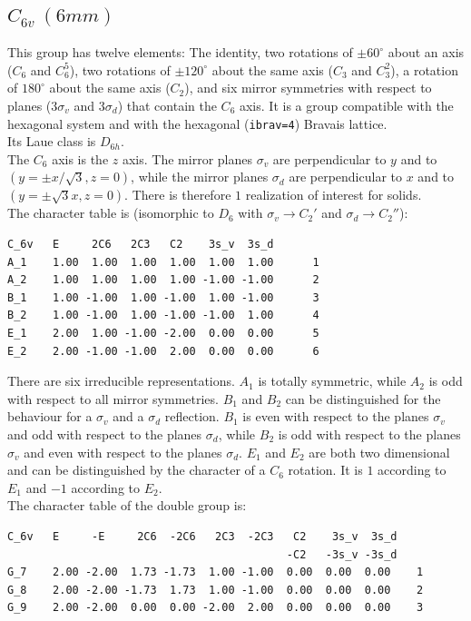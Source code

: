 \documentclass[12pt,a4paper]{article}
\begin{document}
\subsection{\color{web-blue}$C_{6v}\ (6mm)$} 
This group has twelve elements: The identity, two rotations of $\pm60^\circ$ 
about an axis ($C_6$ and $C_6^5$), two rotations of $\pm120^\circ$
about the same axis ($C_3$ and $C_3^2$), a rotation of $180^\circ$ about 
the same axis ($C_2$), and six mirror symmetries with respect to
planes ($3\sigma_v$ and $3\sigma_d$) that contain the $C_6$ axis.
It is a group compatible with the hexagonal system and with the  
hexagonal (\texttt{ibrav=4}) Bravais lattice. \\ 
Its Laue class is $D_{6h}$. \\
The $C_6$ axis is the $z$ axis. The mirror planes $\sigma_v$ are perpendicular 
to $y$ and to $(y=\pm x/\sqrt{3}, z=0)$, while the mirror planes $\sigma_d$
are perpendicular to $x$ and to $(y=\pm \sqrt{3} x, z=0)$.
There is therefore $1$ realization of interest for solids. \\
The character table is (isomorphic to $D_6$ with $\sigma_v \rightarrow C_2'$
and $\sigma_d \rightarrow C_2''$):
\begin{verbatim}
C_6v   E     2C6   2C3   C2    3s_v  3s_d 
A_1    1.00  1.00  1.00  1.00  1.00  1.00      1
A_2    1.00  1.00  1.00  1.00 -1.00 -1.00      2
B_1    1.00 -1.00  1.00 -1.00  1.00 -1.00      3
B_2    1.00 -1.00  1.00 -1.00 -1.00  1.00      4
E_1    2.00  1.00 -1.00 -2.00  0.00  0.00      5
E_2    2.00 -1.00 -1.00  2.00  0.00  0.00      6
\end{verbatim}
There are six irreducible representations. $A_1$ is totally symmetric, while
$A_2$ is odd with respect to all mirror symmetries. $B_1$ and $B_2$ can be
distinguished for the behaviour for a $\sigma_v$ and a
$\sigma_d$ reflection. $B_1$ is even with respect to the planes $\sigma_v$
and odd with respect to the planes $\sigma_d$, while $B_2$ is odd with
respect to the planes $\sigma_v$ and even with respect to the planes 
$\sigma_d$. $E_1$ and $E_2$ are both two dimensional and can be 
distinguished by the character of a $C_6$ rotation. It is
$1$ according to $E_1$ and $-1$ according to $E_2$.\\
The character table of the double group is:
\begin{verbatim}
C_6v   E     -E     2C6  -2C6   2C3  -2C3   C2    3s_v  3s_d
                                           -C2   -3s_v -3s_d
G_7    2.00 -2.00  1.73 -1.73  1.00 -1.00  0.00  0.00  0.00    1
G_8    2.00 -2.00 -1.73  1.73  1.00 -1.00  0.00  0.00  0.00    2
G_9    2.00 -2.00  0.00  0.00 -2.00  2.00  0.00  0.00  0.00    3
\end{verbatim}
\end{document}
